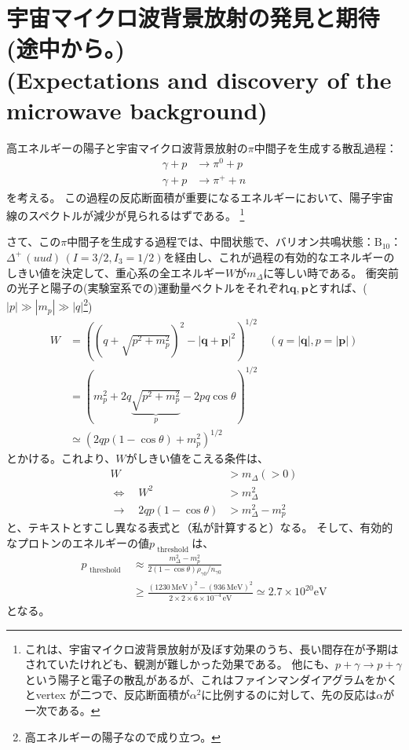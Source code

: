 \documentclass[11pt]{ltjsarticle}
\theoremstyle{plain}
\theoremstyle{break}
\newcommand{\mbfp}{\mathbf{p}}
\newcommand{\mbfq}{\mathbf{q}}
\begin{document}
\section{宇宙マイクロ波背景放射の発見と期待(途中から。)\\(Expectations and discovery of the microwave background)}
高エネルギーの陽子と宇宙マイクロ波背景放射の$\pi$中間子を生成する散乱過程：
\begin{align}
  \gamma + p &\to \pi^0 +p\\
  \gamma + p &\to \pi^+ +n
\end{align}
を考える。
この過程の反応断面積が重要になるエネルギーにおいて、陽子宇宙線のスペクトルが減少が見られるはずである。
\footnote{
これは、宇宙マイクロ波背景放射が及ぼす効果のうち、長い間存在が予期はされていたけれども、観測が難しかった効果である。
他にも、$p + \gamma \to p + \gamma$という陽子と電子の散乱があるが、これはファインマンダイアグラムをかくとvertex が二つで、反応断面積が$\alpha^2$に比例するのに対して、先の反応は$\alpha$が一次である。}

さて、この$\pi$中間子を生成する過程では、中間状態で、バリオン共鳴状態：$\mathrm{B_{10}}$：$\Delta^{+}\,(uud)\,(I =3/2,I_3=1/2)$を経由し、これが過程の有効的なエネルギーのしきい値を決定して、重心系の全エネルギー$W$が$m_{\Delta}$に等しい時である。
衝突前の光子と陽子の(実験室系での)運動量ベクトルをそれぞれ$\mbfq,\mbfp$とすれば、($|p|\gg |m_p| \gg |q|$\footnote{高エネルギーの陽子なので成り立つ。})
\begin{align}
  W
   &=\left(\left(q+\sqrt{p^{2}+m_{p}^{2}}\right)^{2}-|\mathbf{q}+\mathbf{p}|^{2}\right)^{1 / 2}\quad (q = |\mbfq|,p=|\mbfp|)\\
   &=\left(m_p^2+2q\underbrace{\sqrt{p^2+m_p^2}}_{p}-2pq\cos\theta \right)^{1/2}\\
   &\simeq\left(2 q p(1-\cos \theta)+m_{p}^{2}\right)^{1 / 2}
\end{align}%
とかける。これより、$W$がしきい値をこえる条件は、
\begin{align}
  W &> m_{\Delta} (>0)\\
  \Leftrightarrow \quad W^2 &> m_{\Delta}^2 \\
  \rightarrow \quad 2qp(1-\cos\theta) &> m_{\Delta}^2 -m_{p}^2
\end{align}%
と、テキストとすこし異なる表式と（私が計算すると）なる。
そして、有効的なプロトンのエネルギーの値$p_{\text { threshold }}$は、
\begin{align}
  p_{\text { threshold }}
   &\approx \frac{m_{\Delta}^{2}-m_{p}^{2}}{2(1-\cos\theta) \rho_{\gamma 0} / n_{\gamma 0}}\\
   &\geq\frac{(1230\,\mathrm{MeV})^2-(936\,\mathrm{MeV})^2}{2\times2\times 6\times10^{-4}\,\mathrm{eV}} \simeq 2.7 \times 10^{20} \mathrm{eV}
\end{align}%
となる。
\end{document}
